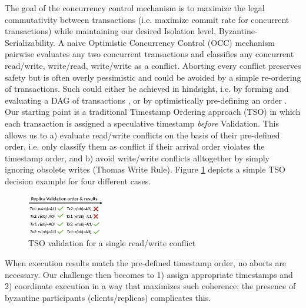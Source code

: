 

The goal of the concurrency control mechanism is to maximize the legal commutativity between transactions (i.e. maximize commit rate for concurrent transactions) while maintaining our desired Isolation level, Byzantine-Serializability. A naive Optimistic Concurrency Control (OCC) mechanism pairwise evaluates any two concurrent transactions and classifies any concurrent read/write, write/read, write/write as a conflict. Aborting every conflict preserves safety but is often overly pessimistic and could be avoided by a simple re-ordering of transactions. Such could either be achieved in hindsight, i.e. by forming and evaluating a DAG of transactions \cite{sharma2018databasify}, or by optimistically pre-defining an order \cite{adya1995efficient, Zhang2015}.
Our starting point is a traditional Timestamp Ordering approach (TSO) in which each transaction is assigned a speculative timestamp \textit{before} Validation. This allows us to a) evaluate read/write conflicts on the basis of their pre-defined order, i.e. only classify them as conflict if their arrival order violates the timestamp order, and b) avoid write/write conflicts alltogether by simply ignoring obsolete writes \cite{thomas1979majority}(Thomas Write Rule). Figure \ref{fig:TSO} depicts a simple TSO decision example for four different cases.

\begin{figure}
\begin{center}
\includegraphics[width= 0.3\textwidth]{./figures/TSO.png}
\end{center}
\caption{TSO validation for a single read/write conflict}
\label{fig:TSO}
\end{figure}
When execution results match the pre-defined timestamp order, no aborts are necessary. Our challenge then becomes to 1) assign appropriate timestamps and 2) coordinate execution in a way that maximizes such coherence; the presence of byzantine participants (clients/replicas) complicates this.

